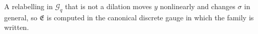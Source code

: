 A relabelling in $\mathcal{G}_q$ that is not a dilation moves $y$ nonlinearly and changes $\sigma$
in general, so $\mathfrak{E}$ is computed in the canonical discrete gauge in which the family is
written.

